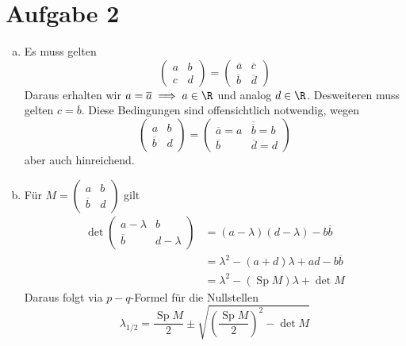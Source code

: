 \documentclass{article}
\begin{document}
    \section*{Aufgabe 2}
    \begin{enumerate}[(a)]
        \item Es muss gelten
        \[
                \begin{pmatrix}
                    a & b\\c & d
                \end{pmatrix} = \begin{pmatrix}
                    \overline{a} & \overline{c}\\ \overline{b} & \overline{d}
                \end{pmatrix}
        \]
        Daraus erhalten wir $a = \overline{a} \implies a \in \R$ und analog $d\in \R$. 
        Desweiteren muss gelten $c = \overline{b}$. Diese Bedingungen sind offensichtlich notwendig, wegen 
        \[
                \begin{pmatrix}
                    a & b\\\overline{b} & d
                \end{pmatrix} = \begin{pmatrix}
                    \overline{a} = a & \overline{\overline{b}} = b\\ \overline{b} & \overline{d} = d
                \end{pmatrix}
        \] aber auch hinreichend.
        \item Für $M =  \begin{pmatrix}
            a  & b\\ \overline{b} & d
        \end{pmatrix}$ gilt
        \begin{align*}
            \det \begin{pmatrix}
                a - \lambda & b\\ \overline{b} & d - \lambda 
            \end{pmatrix} &= (a-\lambda)(d-\lambda) - b\overline{b}\\
            &= \lambda^2 - (a+d)\lambda + ad - b\overline{b}\\
            &= \lambda^2 - (\operatorname{Sp} M) \lambda + \det M
        \end{align*}
        Daraus folgt via $p-q$-Formel für die Nullstellen
        \[
            \lambda_{1/2} = \frac{\operatorname{Sp} M}{2} \pm \sqrt{\left(\frac{\operatorname{Sp} M}{2}\right)^2 - \det M}  
\]
\end{enumerate}
\end{document}
